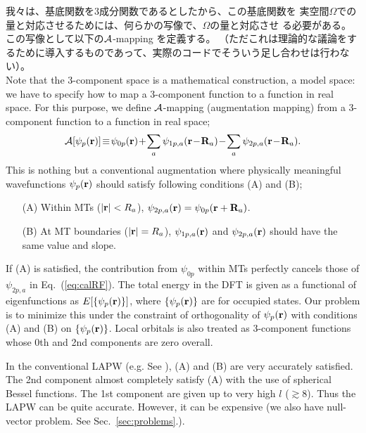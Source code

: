 \documentclass[twocolumn,showpacs,preprintnumbers,amsmath,amssymb,floatfix]{revtex4-1}
\newcommand{\bfr}{{\bf r}}
\newcommand{\bfR}{{\bf R}}
\def\calR{{\cal A}}
\newcommand{\req}[1]{\mbox{Eq.~\!(\ref{#1})}}
\newcommand{\refsec}[1]{\mbox{Sec.~\!\ref{#1}}}
\begin{document}
我々は、基底関数を3成分関数であるとしたから、この基底関数を
実空間$\Omega$での量と対応させるためには、何らかの写像で、$\Omega$の量と対応させ
る必要がある。この写像として以下の$\calR$-mapping を定義する。
（ただこれは理論的な議論をするために導入するものであって、実際のコードでそういう足し合わせは行わない）。\\
Note that the 3-component space is a mathematical
construction, a model space: we have to specify how to map a 3-component 
function to a function in real space.
For this purpose, we define $\calR$-mapping (augmentation mapping)
from a 3-component function to a function in real space;
\begin{eqnarray}
\calR[\psi_p(\bfr)]\!\equiv\! \psi_{0p}(\bfr)
\!+\! \sum_a \psi_{1p,a}(\bfr\!-\!\bfR_a)\!-\!\sum_a \psi_{2p,a}(\bfr\!-\!\bfR_a). \nonumber \\
\label{eq:calRF}
\end{eqnarray}
This is nothing but a conventional augmentation 
where physically meaningful wavefunctions $\psi_{p}(\bfr)$ 
should satisfy following conditions (A) and (B);
\begin{itemize}
\item[(A)]
Within MTs ($|\bfr|<R_a$), $\psi_{2p,a}(\bfr)=\psi_{0p}(\bfr+\bfR_a)$.
\item[(B)]
At MT boundaries ($|\bfr|=R_a$), $\psi_{1p,a}(\bfr)$ and $\psi_{2p,a}(\bfr)$
should have the same value and slope.
\end{itemize}
If (A) is satisfied, the contribution from $\psi_{0p}$ within MTs 
perfectly cancels those of $\psi_{2p,a}$ in \req{eq:calRF}. 
The total energy in the DFT is given as a functional
of eigenfunctions as $E[\{\psi_{p}(\bfr)\}]$, where
$\{\psi_{p}(\bfr)\}$ are for occupied states.
Our problem is to minimize this under the constraint of
orthogonality of $\psi_{p}(\bfr)$ with conditions 
(A) and (B) on $\{\psi_{p}(\bfr)\}$.
Local orbitals \cite{PhysRevB.43.6388} is also treated as 3-component
functions whose 0th and 2nd components are zero overall.

In the conventional LAPW (e.g. See \cite{bluegel31,Singhbook}),
(A) and (B) are very accurately satisfied. The 2nd component
almost completely satisfy (A) with the use of spherical Bessel functions.
The 1st component are given up to very high $l$ ($\gtrsim 8$). 
Thus the LAPW can be quite accurate. However, it can be 
expensive (we also have null-vector problem. See \refsec{sec:problems}.).
\end{document}

